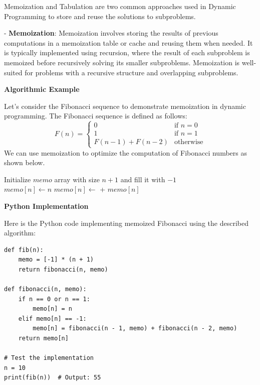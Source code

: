 \documentclass[12pt]{book} %
\begin{document}
Memoization and Tabulation are two common approaches used in Dynamic Programming to store and reuse the solutions to subproblems. 

- \textbf{Memoization}: Memoization involves storing the results of previous computations in a memoization table or cache and reusing them when needed. It is typically implemented using recursion, where the result of each subproblem is memoized before recursively solving its smaller subproblems. Memoization is well-suited for problems with a recursive structure and overlapping subproblems.

\textbf{Algorithmic Example}

Let's consider the Fibonacci sequence to demonstrate memoization in dynamic programming. The Fibonacci sequence is defined as follows:
\FloatBarrier
\[
F(n) =
\begin{cases} 
0 & \text{if } n = 0 \\
1 & \text{if } n = 1 \\
F(n-1) + F(n-2) & \text{otherwise}
\end{cases}
\]
\FloatBarrier
We can use memoization to optimize the computation of Fibonacci numbers as shown below.
\FloatBarrier
\begin{algorithm}
\caption{Memoized Fibonacci}
\begin{algorithmic}[1]
    \State Initialize $memo$ array with size $n+1$ and fill it with $-1$
    \State \Return {}
\EndFunction
\\
        \State $memo[n] \gets n$
        \State $memo[n] \gets$  + 
    \EndIf
    \State \Return $memo[n]$
\EndFunction
\end{algorithmic}
\end{algorithm}
\FloatBarrier
\textbf{Python Implementation}

Here is the Python code implementing memoized Fibonacci using the described algorithm:
\FloatBarrier
\begin{lstlisting}
def fib(n):
    memo = [-1] * (n + 1)
    return fibonacci(n, memo)

def fibonacci(n, memo):
    if n == 0 or n == 1:
        memo[n] = n
    elif memo[n] == -1:
        memo[n] = fibonacci(n - 1, memo) + fibonacci(n - 2, memo)
    return memo[n]

# Test the implementation
n = 10
print(fib(n))  # Output: 55
\end{lstlisting}
\FloatBarrier
\end{document}
